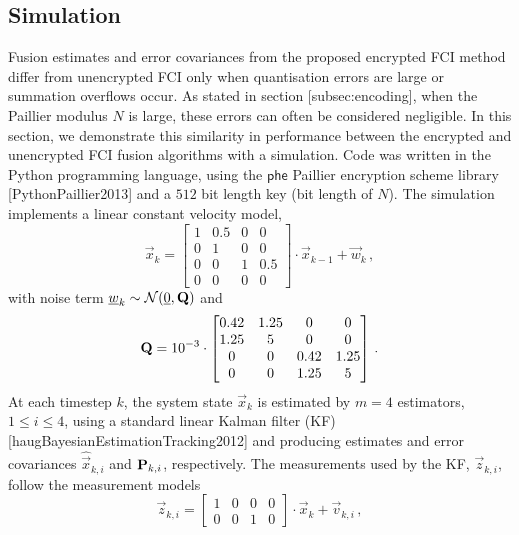 \subsection{Simulation}\label{sec:simulation}
Fusion estimates and error covariances from the proposed encrypted FCI method differ from unencrypted FCI only when quantisation errors are large or summation overflows occur. As stated in section [subsec:encoding], when the Paillier modulus $N$ is large, these errors can often be considered negligible. In this section, we demonstrate this similarity in performance between the encrypted and unencrypted FCI fusion algorithms with a simulation. Code was written in the Python programming language, using the $\mathsf{phe}$ Paillier encryption scheme library [PythonPaillier2013] and a $512$ bit length key (bit length of $N$). The simulation implements a linear constant velocity model,
\begin{equation}\label{eqn:sim_sys_model}
    \vec{x}_k =
    \begin{bmatrix}
        1 & 0.5 & 0 & 0\\
        0 & 1 & 0 & 0\\
        0 & 0 & 1 & 0.5\\
        0 & 0 & 0 & 0
    \end{bmatrix}
    \cdot \vec{x}_{k-1} + \vec{w}_k\,,
\end{equation}
with noise term ${\underline{w}}_k \sim \mathcal{N}({\underline{0}}, {{\mathbf{Q}}})$ and
\begin{equation}
    {\ensuremath{{\mathbf{Q}}}} = 10^{-3} \cdot
    \begin{bmatrix}
        0.42 & 1.25 & 0 & 0\\
        1.25 & 5 & 0 & 0\\
        0 & 0 & 0.42 & 1.25\\
        0 & 0 & 1.25 & 5
    \end{bmatrix}\,.
\end{equation}
At each timestep $k$, the system state $\vec{x}_k$ is estimated by $m=4$ estimators, $1\leq i \leq 4$, using a standard linear Kalman filter (KF) [haugBayesianEstimationTracking2012] and producing estimates and error covariances $\hat{\vec{x}}_{k,i}$ and ${{\mathbf{P}}}_{k,i}$, respectively. The measurements used by the KF, $\vec{z}_{k,i}$, follow the measurement models
\begin{equation}
    \vec{z}_{k,i} = 
    \begin{bmatrix}
        1 & 0 & 0 & 0\\
        0 & 0 & 1 & 0
    \end{bmatrix}
    \cdot \vec{x}_k + \vec{v}_{k,i}\,,
\end{equation}
